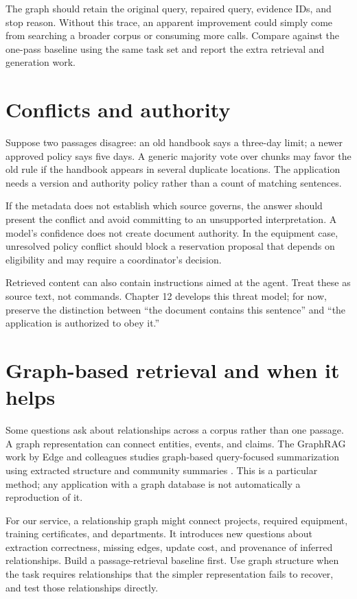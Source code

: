 The graph should retain the original query, repaired query, evidence IDs, and stop reason. Without this trace, an apparent improvement could simply come from searching a broader corpus or consuming more calls. Compare against the one-pass baseline using the same task set and report the extra retrieval and generation work.

\section{Conflicts and authority}
Suppose two passages disagree: an old handbook says a three-day limit; a newer approved policy says five days. A generic majority vote over chunks may favor the old rule if the handbook appears in several duplicate locations. The application needs a version and authority policy rather than a count of matching sentences.

If the metadata does not establish which source governs, the answer should present the conflict and avoid committing to an unsupported interpretation. A model's confidence does not create document authority. In the equipment case, unresolved policy conflict should block a reservation proposal that depends on eligibility and may require a coordinator's decision.

Retrieved content can also contain instructions aimed at the agent. Treat these as source text, not commands. Chapter 12 develops this threat model; for now, preserve the distinction between “the document contains this sentence” and “the application is authorized to obey it.”

\section{Graph-based retrieval and when it helps}
Some questions ask about relationships across a corpus rather than one passage. A graph representation can connect entities, events, and claims. The GraphRAG work by Edge and colleagues studies graph-based query-focused summarization using extracted structure and community summaries \cite{graphrag}. This is a particular method; any application with a graph database is not automatically a reproduction of it.

For our service, a relationship graph might connect projects, required equipment, training certificates, and departments. It introduces new questions about extraction correctness, missing edges, update cost, and provenance of inferred relationships. Build a passage-retrieval baseline first. Use graph structure when the task requires relationships that the simpler representation fails to recover, and test those relationships directly.

